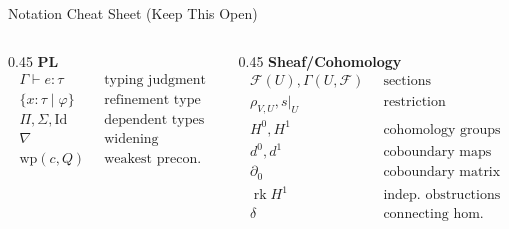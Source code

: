\documentclass[aspectratio=169,10pt]{beamer}
\newcommand{\Fscr}{\mathcal{F}}
\newcommand{\rk}{\operatorname{rk}}
\begin{document}
\begin{frame}{Notation Cheat Sheet (Keep This Open)}
\footnotesize
\begin{columns}[T]
\begin{column}{0.45\textwidth}
\textbf{PL}
\begin{align*}
\Gamma \vdash e : \tau &\;\; \text{typing judgment} \\
\{x:\tau \mid \varphi\} &\;\; \text{refinement type} \\
\Pi, \Sigma, \mathrm{Id} &\;\; \text{dependent types} \\
\nabla &\;\; \text{widening} \\
\text{wp}(c, Q) &\;\; \text{weakest precon.}
\end{align*}
\end{column}
\begin{column}{0.45\textwidth}
\textbf{Sheaf/Cohomology}
\begin{align*}
\Fscr(U), \Gamma(U,\Fscr) &\;\; \text{sections} \\
\rho_{V,U}, s|_U &\;\; \text{restriction} \\
H^0, H^1 &\;\; \text{cohomology groups} \\
d^0, d^1 &\;\; \text{coboundary maps} \\
\partial_0 &\;\; \text{coboundary matrix} \\
\rk H^1 &\;\; \text{indep.\ obstructions} \\
\delta &\;\; \text{connecting hom.}
\end{align*}
\end{column}
\end{columns}
\end{frame}
\end{document}
